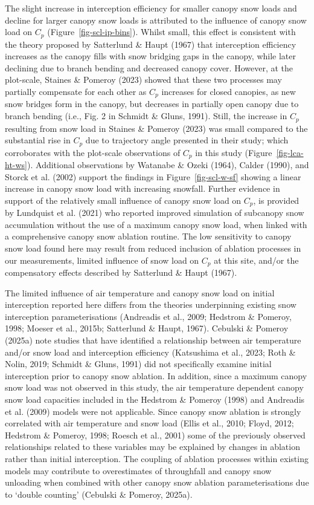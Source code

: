 \documentclass[
  letterpaper,
]{tex/uofsthesis-cs}
\begin{document}
The slight increase in interception efficiency for smaller canopy snow
loads and decline for larger canopy snow loads is attributed to the
influence of canopy snow load on \(C_p\) (Figure~\ref{fig-scl-ip-bins}).
Whilst small, this effect is consistent with the theory proposed by
Satterlund \& Haupt (1967) that interception efficiency increases as the
canopy fills with snow bridging gaps in the canopy, while later
declining due to branch bending and decreased canopy cover. However, at
the plot-scale, Staines \& Pomeroy (2023) showed that these two
processes may partially compensate for each other as \(C_p\) increases
for closed canopies, as new snow bridges form in the canopy, but
decreases in partially open canopy due to branch bending (i.e., Fig. 2
in Schmidt \& Gluns, 1991). Still, the increase in \(C_p\) resulting
from snow load in Staines \& Pomeroy (2023) was small compared to the
substantial rise in \(C_p\) due to trajectory angle presented in their
study; which corroborates with the plot-scale observations of \(C_p\) in
this study (Figure~\ref{fig-lca-ht-ws}). Additional observations by
Watanabe \& Ozeki (1964), Calder (1990), and Storck et al. (2002)
support the findings in Figure~\ref{fig-scl-w-sf} showing a linear
increase in canopy snow load with increasing snowfall. Further evidence
in support of the relatively small influence of canopy snow load on
\(C_p\), is provided by Lundquist et al. (2021) who reported improved
simulation of subcanopy snow accumulation without the use of a maximum
canopy snow load, when linked with a comprehensive canopy snow ablation
routine. The low sensitivity to canopy snow load found here may result
from reduced inclusion of ablation processes in our measurements,
limited influence of snow load on \(C_p\) at this site, and/or the
compensatory effects described by Satterlund \& Haupt (1967).

The limited influence of air temperature and canopy snow load on initial
interception reported here differs from the theories underpinning
existing snow interception parameterisations (Andreadis et al., 2009;
Hedstrom \& Pomeroy, 1998; Moeser et al., 2015b; Satterlund \& Haupt,
1967). Cebulski \& Pomeroy (2025a) note studies that have identified a
relationship between air temperature and/or snow load and interception
efficiency (Katsushima et al., 2023; Roth \& Nolin, 2019; Schmidt \&
Gluns, 1991) did not specifically examine initial interception prior to
canopy snow ablation. In addition, since a maximum canopy snow load was
not observed in this study, the air temperature dependent canopy snow
load capacities included in the Hedstrom \& Pomeroy (1998) and Andreadis
et al. (2009) models were not applicable. Since canopy snow ablation is
strongly correlated with air temperature and snow load (Ellis et al.,
2010; Floyd, 2012; Hedstrom \& Pomeroy, 1998; Roesch et al., 2001) some
of the previously observed relationships related to these variables may
be explained by changes in ablation rather than initial interception.
The coupling of ablation processes within existing models may contribute
to overestimates of throughfall and canopy snow unloading when combined
with other canopy snow ablation parameterisations due to `double
counting' (Cebulski \& Pomeroy, 2025a).
\end{document}
